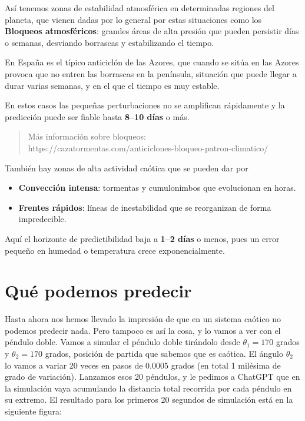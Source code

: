 \documentclass[
  10pt,
  a4paper,
  DIV=11,
  numbers=noendperiod,
  open=any]{scrreprt}
\providecommand{\tightlist}{%
  \setlength{\itemsep}{0pt}\setlength{\parskip}{0pt}}
\numberwithin{equation}{chapter}
\numberwithin{equation}{section}
\renewcommand{\[}{\begin{equation}}
\renewcommand{\]}{\end{equation}}
\begin{document}
Así tenemos zonas de estabilidad atmosférica en determinadas regiones
del planeta, que vienen dadas por lo general por estas situaciones como
los \textbf{Bloqueos atmosféricos}: grandes áreas de alta presión que
pueden persistir días o semanas, desviando borrascas y estabilizando el
tiempo.

En España es el típico anticiclón de las Azores, que cuando se sitúa en
las Azores provoca que no entren las borrascas en la península,
situación que puede llegar a durar varias semanas, y en el que el tiempo
es muy estable.

En estos casos las pequeñas perturbaciones no se amplifican rápidamente
y la predicción puede ser fiable hasta \textbf{8--10 días} o más.

\begin{quote}
Más información sobre bloqueos:\\
https://cazatormentas.com/anticiclones-bloqueo-patron-climatico/
\end{quote}

También hay zonas de alta actividad caótica que se pueden dar por

\begin{itemize}
\tightlist
\item
  \textbf{Convección intensa}: tormentas y cumulonimbos que evolucionan
  en horas.
\item
  \textbf{Frentes rápidos}: líneas de inestabilidad que se reorganizan
  de forma impredecible.
\end{itemize}

Aquí el horizonte de predictibilidad baja a \textbf{1--2 días} o menos,
pues un error pequeño en humedad o temperatura crece exponencialmente.

\chapter{Qué podemos predecir}\label{quuxe9-podemos-predecir}

Hasta ahora nos hemos llevado la impresión de que en un sistema caótico
no podemos predecir nada. Pero tampoco es así la cosa, y lo vamos a ver
con el péndulo doble. Vamos a simular el péndulo doble tirándolo desde
\(\theta_1=170\) grados y \(\theta_2=170\) grados, posición de partida
que sabemos que es caótica. El ángulo \(\theta_2\) lo vamos a variar 20
veces en pasos de 0.0005 grados (en total 1 milésima de grado de
variación). Lanzamos esos 20 péndulos, y le pedimos a ChatGPT que en la
simulación vaya acumulando la distancia total recorrida por cada péndulo
en su extremo. El resultado para los primeros 20 segundos de simulación
está en la siguiente figura:
\end{document}
